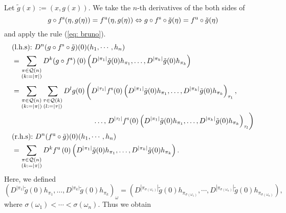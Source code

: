 \documentclass[a4paper,11pt,fleqn]{article}
\begin{document}
Let $\tilde{g}(x):=(x,g(x))$. We take the $n$-th derivatives of the both sides of 
\begin{equation}
    g\circ f^{\rm s}(\eta,g(\eta)) = f^{\rm u}(\eta,g(\eta)) \Leftrightarrow g\circ f^{\rm s} \circ \tilde{g}(\eta) = f^{\rm u} \circ \tilde{g}(\eta)
\end{equation}
and apply the rule (\ref{eq: bruno}). 
\begin{align}
    &\text{(l.h.s):} \ D^n (g\circ f^{\rm s} \circ \tilde{g})(0)(h_1,\cdots,h_n) \nonumber \\
    & = \sum_{\substack{\pi \in \mathcal{Q}(n) \\
    (k:=|\pi|)}} D^k (g\circ f^{\rm s})\left(0\right)\left(D^{\left|\pi_1\right|} \tilde{g}(0) h_{\pi_1}, \ldots, D^{\left|\pi_k\right|} \tilde{g}(0) h_{\pi_k}\right) \nonumber \\
    & = \sum_{\substack{\pi \in \mathcal{Q}(n) \\
    (k:=|\pi|)}} \sum_{\substack{\tau \in \mathcal{Q}(k) \\
    (l:=|\tau|)}} D^l g (0) \left(D^{\left|\tau_1\right|} f^{\rm s}(0) \left(D^{\left|\pi_1\right|} \tilde{g}(0) h_{\pi_1}, \ldots, D^{\left|\pi_k\right|} \tilde{g}(0) h_{\pi_k}\right)_{\tau_1}
    , \right. \nonumber \\ 
    &\hspace{4cm} \ldots, \left. D^{\left|\tau_l\right|} f^{\rm s}(0) \left(D^{\left|\pi_1\right|} \tilde{g}(0) h_{\pi_1}, \ldots, D^{\left|\pi_k\right|} \tilde{g}(0) h_{\pi_k}\right)_{\tau_l}\right) \\
    &\text{(r.h.s):} \ D^n (f^{\rm u} \circ \tilde{g})(0)(h_1,\cdots,h_n) \nonumber \\
    &= \sum_{\substack{\pi \in \mathcal{Q}(n) \\
    (k:=|\pi|)}} D^k f^{\rm u}\left(0\right)\left(D^{\left|\pi_1\right|} \tilde{g}(0) h_{\pi_1}, \ldots, D^{\left|\pi_k\right|} \tilde{g}(0) h_{\pi_k}\right). 
\end{align}
Here, we defined  
\begin{equation}
    \left(D^{\left|\pi_1\right|} \tilde{g}(0) h_{\pi_1}, \ldots, D^{\left|\pi_k\right|} \tilde{g}(0) h_{\pi_k}\right)_{\omega} =
     \left( D^{\left|\pi_{\sigma(\omega_1)}\right|} \tilde{g}(0) h_{\pi_{\sigma(\omega_1)}},\cdots, D^{\left|\pi_{\sigma(\omega_n)}\right|} \tilde{g}(0) h_{\pi_{\sigma(\omega_n)}} \right),
\end{equation}
where $\sigma(\omega_1)< \cdots < \sigma(\omega_n)$. 
Thus we obtain 
\end{document}
